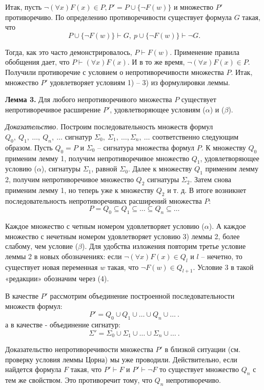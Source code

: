 \documentclass[a4paper]{article}
\begin{document}
Итак, пусть $\neg (\forall x)F(x) \in P, P' = P \cup \{\neg F(w)\}$ и множество $P'$ противоречиво. По определению противоречивости существует формула $G$ такая, что
$$
P \cup \{ \neg F(w) \} \vdash G,\ p \cup \{ \neg F(w) \} \vdash \neg G. %
$$

Тогда, как это часто демонстрировалось, $P \vdash F(w)$. Применение правила обобщения дает, что $P \vdash (\forall x)F(x)$. И в то же время, $\neg (\forall x)F(x) \in P$. Получили противоречие с условием о непротиворечивости множества $P$. Итак, множество $P'$ удовлетворяет условиям 1) -- 3) из формулировки леммы.

\textbf{Лемма 3.} Для любого непротиворечивого множества $P$ существует непротиворечивое расширение $P'$, удовлетворяющее условиям ($\alpha$) и ($\beta$).

\textit{Доказательство.} Построим последовательность множеств формул $Q_0,\ Q_1,\ \dots,\ Q_n,\ \dots$ сигнатур $\Sigma_0,\ \Sigma_1,\ \dots, \Sigma_n,\ \dots$ соответственно следующим образом. Пусть $Q_0 = P$ и $\Sigma_0$ -- сигнатура множества формул $P$. К множеству $Q_0$ применим лемму 1, получим непротиворечивое множество $Q_1$, удовлетворяющее условию ($\alpha$), сигнатуры $\Sigma_1$, равной $\Sigma_0$. Далее к множеству $Q_1$ применим лемму 2, получим непротиворечивое множество $Q_2$ сигнатуры $\Sigma_2$. Затем снова применим лемму 1, но теперь уже к множеству $Q_2$ и т. д. В итоге возникнет последовательность непротиворечивых расширений множества $P$:
$$
P = Q_0 \subseteq Q_1 \subseteq \dots \subseteq Q_n \subseteq \dots
$$


Каждое множество с четным номером удовлетворяет условию ($\alpha$). А каждое множество с нечетным номером удовлетворяет условию 3) леммы 2, более слабому, чем условие ($\beta$). Для удобства изложения повторим третье условие леммы 2 в новых обозначениях: если $\neg (\forall x)F(x) \in Q_l$ и $l$ -- нечетно, то существует новая переменная $w$ такая, что $\neg F(w) \in Q_{l+1}$. Условие 3 в такой «редакции» обозначим через (4).

В качестве $P'$ рассмотрим объединение построенной последовательности множеств формул:
$$
P' = Q_0 \cup Q_1 \cup \dots \cup Q_n \cup \dots\ .
$$
а в качестве - объединение сигнатур:
$$
\Sigma' = \Sigma_0 \cup \Sigma_1 \cup \dots \cup \Sigma_n \cup \dots\ .
$$


Доказательство непротиворечивости множества $P'$ в близкой ситуации (см. проверку условия леммы Цорна) мы уже проводили. Действительно, если найдется формула $F$ такая, что $P' \vdash F$ и $P' \vdash \neg F$ то существует множество $Q_n$ с тем же свойством. Это противоречит тому, что $Q_n$ непротиворечиво.
\end{document}
